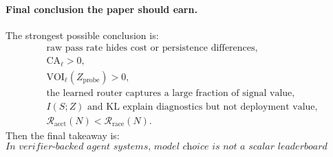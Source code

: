 \documentclass{article}
\begin{document}
\paragraph{Final conclusion the paper should earn.}
The strongest possible conclusion is:
\[
\begin{aligned}
    &\text{raw pass rate hides cost or persistence differences},\\
    &\mathrm{CA}_\ell>0,\\
    &\mathrm{VOI}_\ell(Z_{\mathrm{probe}})>0,\\
    &\text{the learned router captures a large fraction of signal value},\\
    &I(S;Z)\text{ and KL explain diagnostics but not deployment value},\\
    &\mathcal R_{\mathrm{acct}}(N)<\mathcal R_{\mathrm{race}}(N).
\end{aligned}
\]
Then the final takeaway is:
\[
    \boxed{
    \textit{
    In verifier-backed agent systems, model choice is not a scalar leaderboard problem.
    It is a decision-theoretic accounting problem:
    estimate mode-conditioned losses, cheap-signal value, router regret, and selection regret.
    }
    }
\]
\end{document}
